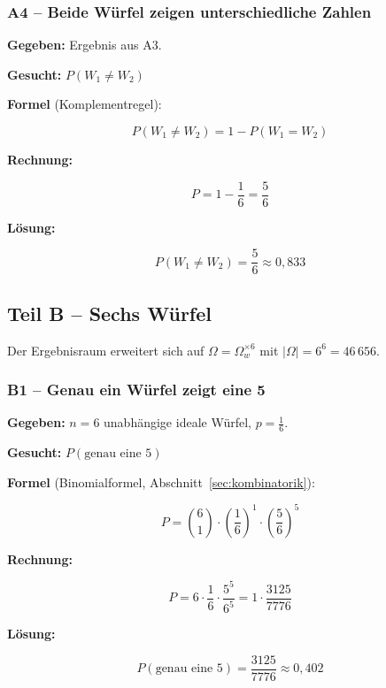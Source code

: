 \subsubsection*{A4 – Beide Würfel zeigen unterschiedliche Zahlen}

\begin{beispiel}

\textbf{Gegeben:} Ergebnis aus A3.

\textbf{Gesucht:} $P(W_1 \neq W_2)$

\textbf{Formel} (Komplementregel):

$$
P(W_1 \neq W_2) = 1 - P(W_1 = W_2)
$$

\textbf{Rechnung:}

$$
P = 1 - \frac{1}{6} = \frac{5}{6}
$$

\textbf{Lösung:}

$$
\boxed{P(W_1 \neq W_2) = \frac{5}{6} \approx 0{,}833}
$$

\end{beispiel}

\subsection*{Teil B – Sechs Würfel}

Der Ergebnisraum erweitert sich auf
$\Omega = \Omega_w^{\times 6}$ mit $|\Omega| = 6^6 = 46\,656$.

\subsubsection*{B1 – Genau ein Würfel zeigt eine 5}

\begin{beispiel}

\textbf{Gegeben:} $n = 6$ unabhängige ideale Würfel, $p = \tfrac{1}{6}$.

\textbf{Gesucht:} $P(\text{genau eine 5})$

\textbf{Formel} (Binomialformel, Abschnitt~\ref{sec:kombinatorik}):

$$
P = \binom{6}{1}\cdot\left(\frac{1}{6}\right)^{1}\cdot\left(\frac{5}{6}\right)^{5}
$$

\textbf{Rechnung:}

$$
P = 6 \cdot \frac{1}{6} \cdot \frac{5^5}{6^5}
  = 1 \cdot \frac{3125}{7776}
$$

\textbf{Lösung:}

$$
\boxed{P(\text{genau eine 5}) = \frac{3125}{7776} \approx 0{,}402}
$$

\end{beispiel}

